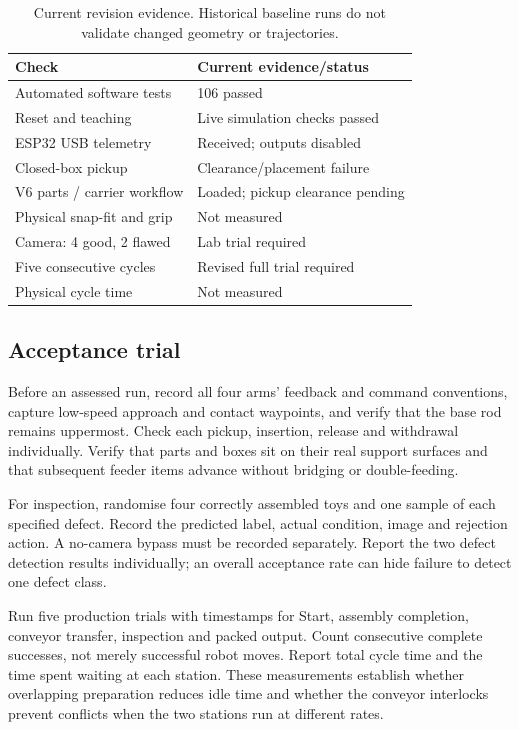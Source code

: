 \documentclass{article}
\begin{document}
\begin{table}[h]
\centering\small
\begin{tabular}{p{}p{}}
\hline
Check & Current evidence/status \\
\hline
Automated software tests & 106 passed \\
Reset and teaching & Live simulation checks passed \\
ESP32 USB telemetry & Received; outputs disabled \\
Closed-box pickup & Clearance/placement failure \\
V6 parts / carrier workflow & Loaded; pickup clearance pending \\
Physical snap-fit and grip & Not measured \\
Camera: 4 good, 2 flawed & Lab trial required \\
Five consecutive cycles & Revised full trial required \\
Physical cycle time & Not measured \\
\hline
\end{tabular}
\caption{Current revision evidence. Historical baseline runs do not validate changed geometry or trajectories.}
\end{table}

\subsection{Acceptance trial}
Before an assessed run, record all four arms' feedback and command conventions, capture low-speed approach and contact waypoints, and verify that the base rod remains uppermost. Check each pickup, insertion, release and withdrawal individually. Verify that parts and boxes sit on their real support surfaces and that subsequent feeder items advance without bridging or double-feeding.

For inspection, randomise four correctly assembled toys and one sample of each specified defect. Record the predicted label, actual condition, image and rejection action. A no-camera bypass must be recorded separately. Report the two defect detection results individually; an overall acceptance rate can hide failure to detect one defect class.

Run five production trials with timestamps for Start, assembly completion, conveyor transfer, inspection and packed output. Count consecutive complete successes, not merely successful robot moves. Report total cycle time and the time spent waiting at each station. These measurements establish whether overlapping preparation reduces idle time and whether the conveyor interlocks prevent conflicts when the two stations run at different rates.
\end{document}
